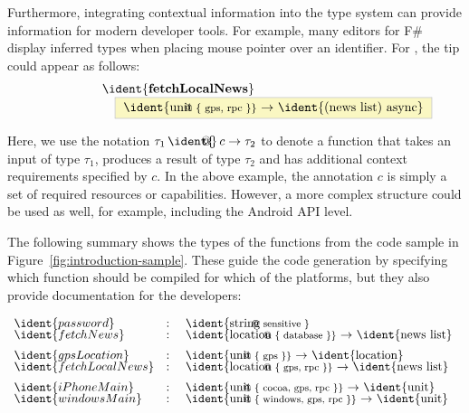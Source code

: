 Furthermore, integrating contextual information into the type system can provide information for
modern developer tools. For example, many editors for F\# display inferred types when placing mouse
pointer over an identifier. For , the tip could appear as follows:
%
\newcommand{\introfunc}[3]{ \ident{#1 \hspace{-1em}\footnotesize{@} \{ #2 \}} $\rightarrow$ \ident{#3}  }
\newcommand{\introvar}[2]{ \ident{#1 \hspace{-1em}\footnotesize{@} #2 } }
\vspace{0.5em}
\begin{equation*}
\hspace{5em}
\begin{array}{l}
\ident{\textbf{fetchLocalNews}}\\
\hspace{1em} \fcolorbox{tooltipb}{tooltipy}{
	\introfunc{unit}{gps, rpc}{(news~list)~async}
}
\end{array}
\end{equation*}
\vspace{0.5em}

Here, we use the notation $\tau_1 \,\ident{\hspace{-1em}\footnotesize{@}}\, c \rightarrow \tau_2$ to denote 
a function that takes an input of type $\tau_1$, produces a result of type $\tau_2$ and has additional 
context requirements specified by $c$. In the above example, the annotation $c$ is simply a set of 
required resources or capabilities. However, a more complex structure could be used as well, for example,
including the Android API level.

The following summary shows the types of the functions from the code sample in 
Figure~\ref{fig:introduction-sample}. These guide the code generation by specifying which 
function should be compiled for which of the platforms, but they also provide documentation
for the developers:

\begin{equation*}
\begin{array}{lcl}
\ident{password} &:& $\introvar{string}{sensitive}$\\[-0.25em]
\ident{fetchNews} &:& $\introfunc{location}{database}{news~list}$\\[0.5em]
\ident{gpsLocation} &:& $\introfunc{unit}{gps}{location}$\\[-0.25em]
\ident{fetchLocalNews} &:& $\introfunc{location}{gps, rpc}{news~list}$\\[0.5em]
\ident{iPhoneMain} &:& $\introfunc{unit}{ cocoa, gps, rpc}{unit}$\\[-0.25em]
\ident{windowsMain} &:& $\introfunc{unit}{ windows, gps, rpc}{unit}$
\end{array}
\end{equation*}

